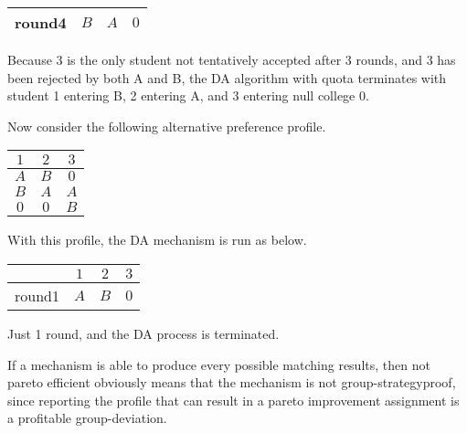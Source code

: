 \begin{example}
\begin{center}
\begin{tabular}{|c|c|c|c|}
        round4&$B$ & $A$ & $0$\\
        \hline
        
      \end{tabular}
    \end{center}

Because 3 is the only student not tentatively accepted after 3 rounds,
and 3 has been rejected by both A and B, the DA algorithm with quota
terminates with student 1 entering B, 2 entering A, and 3 entering null college $0$.

Now consider the following alternative preference profile.
\begin{center}
  \begin{tabular}{|c|c|c|}
    \hline
    $1$ & $2$ & $3$ \\
    \hline
    $A$ & $B$ & $0$ \\
    
    $B$ & $A$ & $A$ \\

    $0$ & $0$ & $B$ \\

    \hline
    
  \end{tabular}
\end{center}

With this profile, the DA mechanism is run as below.

\begin{center}
  \begin{tabular}{|c|c|c|c|}
    \hline
    &$1$ & $2$ & $3$\\
    \hline
    round1& $A$  & $B$ & $0$ \\
    
    \hline
    
  \end{tabular}
\end{center}

Just 1 round, and the DA process is terminated.





\end{example} 

\begin{remark}
 If a mechanism is able to produce every possible matching results, then not pareto efficient obviously means that the mechanism is not group-strategyproof, since reporting the profile that can result in a pareto improvement assignment is a profitable group-deviation.
\end{remark}



